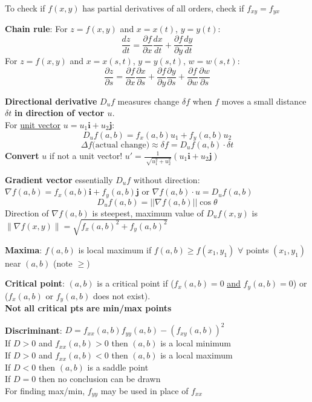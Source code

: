 \documentclass[a4paper,landscape]{article}
\newcommand{\rnname}[1]{\textbf{#1}}
\begin{document}
\begin{multicols*}{3}
\begin{flatitemize}
\item To check if $f(x,y)$ has partial derivatives of all orders, check if $f_{xy}=f_{yx}$

\item \rnname{Chain rule}: For $z=f(x,y)$ and $x=x(t)$, $y=y(t)$:
$$\frac{dz}{dt} = \frac{\partial f}{\partial x} \frac{dx}{dt}+\frac{\partial f}{\partial y} \frac{dy}{dt}$$
For $z=f(x,y)$ and $x=x(s,t)$, $y=y(s,t)$, $w=w(s,t)$:
$$\frac{\partial z}{\partial s} = \frac{\partial f}{\partial x} \frac{\partial x}{\partial s}+\frac{\partial f}{\partial y} \frac{\partial y}{\partial s}+\frac{\partial f}{\partial w} \frac{\partial w}{\partial s}$$

\item \rnname{Directional derivative} $D_uf$ measures change $\delta f$ when $f$ moves a small distance $\delta t$ \textbf{in direction of vector $u$}.\\
For \underline{unit vector} $u=u_1\mathbf{i}+u_2\mathbf{j}$:
$$D_uf(a,b)=f_x(a,b)u_1+f_y(a,b)u_2$$
$$\Delta f \text{(actual change)} \approx \delta f = D_uf(a,b) \cdot \delta t$$
\textbf{Convert} $u$ if not a unit vector! $u' = \frac{1}{\sqrt[]{u_1^2 + u_2^2}}(u_1\mathbf{i}+u_2\mathbf{j})$

\item \rnname{Gradient vector} essentially $D_uf$ without direction: $\nabla f(a,b) =f_x(a,b)\mathbf{i}+f_y(a,b)\mathbf{j}$ or $\nabla f(a,b) \cdot u=D_uf(a,b)$ \\
$$D_uf(a,b)=||\nabla f(a,b)||\cos\theta$$
Direction of $\nabla f(a,b)$ is steepest, maximum value of $D_uf(x,y)$ is $\left\|\nabla f(x,y)\right\| = \sqrt{f_x(a,b)^2+f_y(a,b)^2}$

\item \rnname{Maxima}: $f(a,b)$ is local maximum if $f(a,b) \geq f(x_1,y_1)$ $\forall$ points $(x_1,y_1)$ near $(a,b)$ (note $\geq$)
\item \rnname{Critical point}: $(a,b)$ is a critical point if ($f_x(a,b)=0$ \underline{and} $f_y(a,b)=0$) or ($f_x(a,b)$ or $f_y(a,b)$ does not exist). \\
\textbf{Not all critical pts are min/max points}
\item \rnname{Discriminant}: $D=f_{xx}(a,b)f_{yy}(a,b)-(f_{xy}(a,b))^2$ \\
If $D>0$ and $f_{xx}(a,b)>0$ then $(a,b)$ is a local minimum \\
If $D>0$ and $f_{xx}(a,b)<0$ then $(a,b)$ is a local maximum \\
If $D<0$ then $(a,b)$ is a saddle point \\
If $D=0$ then no conclusion can be drawn \\
\vspace{0.4em}
For finding max/min, $f_{yy}$ may be used in place of $f_{xx}$


\end{flatitemize}
\end{multicols*}
\end{document}
